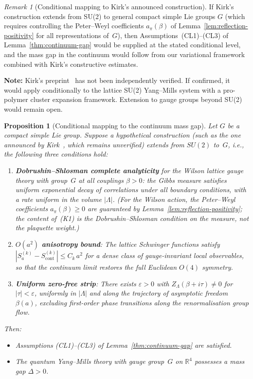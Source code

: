 \documentclass[12pt,a4paper]{article}
\theoremstyle{definition}
\theoremstyle{plain}
\newtheorem{proposition}[definition]{Proposition}
\theoremstyle{remark}
\newtheorem{remark}[definition]{Remark}
\begin{document}
\begin{remark}[Conditional mapping to Kirk's announced construction]
If Kirk's construction extends from SU(2) to general compact simple
Lie groups $G$ (which requires controlling the Peter--Weyl coefficients
$a_\pi(\beta)$ of Lemma~\ref{lem:reflection-positivity} for all
representations of~$G$), then Assumptions~(CL1)--(CL3) of
Lemma~\ref{thm:continuum-gap} would be supplied at the stated conditional level, and the
mass gap in the continuum would follow from our variational framework
combined with Kirk's constructive estimates.

\textbf{Note:} Kirk's preprint~\cite{Kirk2026} has not been independently verified. If confirmed, it would apply conditionally to the lattice SU(2) Yang--Mills system with a pro-polymer cluster expansion framework. Extension to gauge groups beyond SU(2) would remain open.
\end{remark}

\begin{proposition}[Conditional mapping to the continuum mass gap]
\label{prop:kirk-mapping}
Let $G$ be a compact simple Lie group. Suppose a hypothetical
construction (such as the one announced by Kirk~\cite{Kirk2026}, which remains unverified) extends from $SU(2)$ to~$G$,
i.e., the following three conditions hold:
\begin{enumerate}[label=\textup{(K\arabic*)}]
    \item \textbf{Dobrushin--Shlosman complete analyticity} for the
        Wilson lattice gauge theory with group~$G$ at all couplings $\beta > 0$:
        the Gibbs measure satisfies uniform exponential decay of
        correlations under all boundary conditions, with a rate uniform
        in the volume $|\Lambda|$. (For the Wilson action, the Peter--Weyl coefficients
        $a_\pi(\beta) \geq 0$ are guaranteed by Lemma~\ref{lem:reflection-positivity};
        the content of~\textup{(K1)} is the Dobrushin--Shlosman condition on the
        \emph{measure}, not the plaquette weight.)
    \item \textbf{$O(a^2)$ anisotropy bound}: The lattice Schwinger functions
        satisfy $|S^{(k)}_a - S^{(k)}_{\mathrm{cont}}| \leq C_k\,a^2$ for
        a dense class of gauge-invariant local observables, so that
        the continuum limit restores the full Euclidean $O(4)$ symmetry.
    \item \textbf{Uniform zero-free strip}: There exists $\varepsilon > 0$
        with $Z_\Lambda(\beta + i\tau) \neq 0$ for $|\tau| < \varepsilon$,
        uniformly in $|\Lambda|$ and along the trajectory of asymptotic
        freedom $\beta(a)$, excluding first-order phase transitions along the
        renormalisation group flow.
\end{enumerate}
Then:
\begin{itemize}
    \item[\textup{(a)}] Assumptions \textup{(CL1)--(CL3)} of
        Lemma~\ref{thm:continuum-gap} are satisfied.
    \item[\textup{(b)}] The quantum Yang--Mills theory with gauge group~$G$
        on $\mathbb{R}^4$ possesses a mass gap $\Delta > 0$.
\end{itemize}
\end{proposition}
\end{document}
